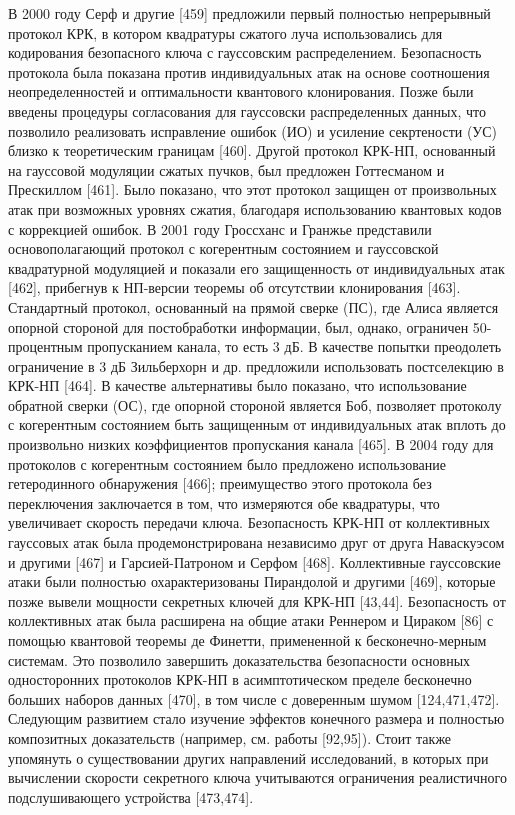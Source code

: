 В 2000 году Серф и другие [459] предложили первый полностью непрерывный протокол КРК, в котором квадратуры сжатого луча использовались для кодирования безопасного ключа с гауссовским распределением. Безопасность протокола была показана против индивидуальных атак на основе соотношения неопределенностей и оптимальности квантового клонирования. Позже были введены процедуры согласования для гауссовски распределенных данных, что позволило реализовать исправление ошибок (ИО) и усиление секртености (УС)  близко к теоретическим границам [460]. Другой протокол КРК-НП, основанный на гауссовой модуляции сжатых пучков, был предложен Готтесманом и Прескиллом [461]. Было показано, что этот протокол защищен от произвольных атак при возможных уровнях сжатия, благодаря использованию квантовых кодов с коррекцией ошибок. В 2001 году Гроссханс и Гранжье представили основополагающий протокол с когерентным состоянием и гауссовской квадратурной модуляцией и показали его защищенность от индивидуальных атак [462], прибегнув к НП-версии теоремы об отсутствии клонирования [463]. Стандартный протокол, основанный на прямой сверке (ПС), где Алиса является опорной стороной для постобработки информации, был, однако, ограничен 50-процентным пропусканием канала, то есть 3 дБ. В качестве попытки преодолеть ограничение в 3 дБ Зильберхорн и др. предложили использовать постселекцию в КРК-НП [464]. В качестве альтернативы было показано, что использование обратной сверки (ОС), где опорной стороной является Боб, позволяет протоколу с когерентным состоянием быть защищенным от индивидуальных атак вплоть до произвольно низких коэффициентов пропускания канала [465]. В 2004 году для протоколов с когерентным состоянием было предложено использование гетеродинного обнаружения [466]; преимущество этого протокола без переключения заключается в том, что измеряются обе квадратуры, что увеличивает скорость передачи ключа. Безопасность КРК-НП от коллективных гауссовых атак была продемонстрирована независимо друг от друга Наваскуэсом и другими [467] и Гарсией-Патроном и Серфом [468]. Коллективные гауссовские атаки были полностью охарактеризованы Пирандолой и другими [469], которые позже вывели мощности секретных ключей для КРК-НП [43,44]. Безопасность от коллективных атак была расширена на общие атаки Реннером и Цираком [86] с помощью квантовой теоремы де Финетти, примененной к бесконечно-мерным системам. Это позволило завершить доказательства безопасности основных односторонних протоколов КРК-НП в асимптотическом пределе бесконечно больших наборов данных [470], в том числе с доверенным шумом [124,471,472]. Следующим развитием стало изучение эффектов конечного размера и полностью композитных доказательств (например, см. работы [92,95]). Стоит также упомянуть о существовании других направлений исследований, в которых при вычислении скорости секретного ключа учитываются ограничения реалистичного подслушивающего устройства [473,474].
